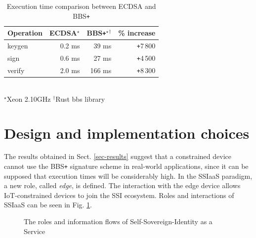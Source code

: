 \begin{table}[!h]
    \centering
    \begin{tabular}{| l || r | r | r|}
        \hline 
        \textbf{Operation} & \textbf{ECDSA}$^\star$ & \textbf{BBS\texttt{+}}$^\star$$^\dagger$ & \textbf{\% increase} \\ [0.5ex] 
        \hline  \hline 
        keygen   & 0.2   ms      & 39 ms   &\texttt{+}7\,800\\
        \hline
        sign     & 0.6   ms      & 27  ms   &\texttt{+}4\,500\\
        \hline
        verify   & 2.0  ms         & 166 ms   &\texttt{+}8\,300\\
        \hline
    \end{tabular}
    \\
    \footnotesize $^\star$Xeon 2.10GHz \enspace\enspace $^\dagger$Rust bbs library
    \caption{Execution time comparison between ECDSA and BBS\texttt{+}}
    \label{time-table2}
\end{table}

\section{Design and implementation choices}
\label{sec:Design}
The results obtained in Sect. \ref{sec-results} suggest that a constrained device cannot use the BBS\texttt{+} signature scheme in real-world applications, since it can be supposed that execution times will be considerably high. In the SSIaaS paradigm, a new role, called \textit{edge}, is defined. The interaction with the edge device allows IoT-constrained devices to join the SSI ecosystem. Roles and interactions of SSIaaS can be seen in Fig. \ref{SSIaaS-img}.

\begin{figure}[H]
    \centering
    
    \caption{The roles and information flows of Self-Sovereign-Identity as a Service}
    \label{SSIaaS-img}
\end{figure}


